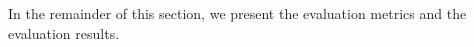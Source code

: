 In the remainder of this section, we present the evaluation metrics and the evaluation results.







%
%
%

